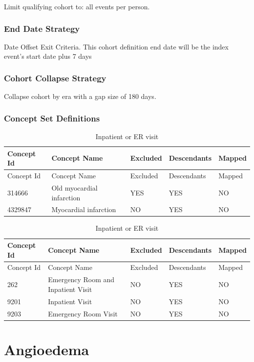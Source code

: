 \documentclass[10.5pt]{book}
\theoremstyle{definition}
\theoremstyle{definition}
\theoremstyle{definition}
\theoremstyle{remark}
\begin{document}
Limit qualifying cohort to: all events per person.

\subsubsection*{End Date Strategy}\label{end-date-strategy-2}

Date Offset Exit Criteria. This cohort definition end date will be the
index event's start date plus 7 days

\subsubsection*{Cohort Collapse
Strategy}\label{cohort-collapse-strategy-2}

Collapse cohort by era with a gap size of 180 days.

\subsubsection*{Concept Set
Definitions}\label{concept-set-definitions-2}

\begin{longtable}[]{@{}lllll@{}}
\caption{\label{tab:ami} Inpatient or ER visit}\tabularnewline
\toprule
Concept Id & Concept Name & Excluded & Descendants &
Mapped\tabularnewline
\midrule
\endfirsthead
\toprule
Concept Id & Concept Name & Excluded & Descendants &
Mapped\tabularnewline
\midrule
\endhead
314666 & Old myocardial infarction & YES & YES & NO\tabularnewline
4329847 & Myocardial infarction & NO & YES & NO\tabularnewline
\bottomrule
\end{longtable}

\begin{longtable}[]{@{}lllll@{}}
\caption{\label{tab:inpatientOrErAmi} Inpatient or ER visit}\tabularnewline
\toprule
Concept Id & Concept Name & Excluded & Descendants &
Mapped\tabularnewline
\midrule
\endfirsthead
\toprule
Concept Id & Concept Name & Excluded & Descendants &
Mapped\tabularnewline
\midrule
\endhead
262 & Emergency Room and Inpatient Visit & NO & YES & NO\tabularnewline
9201 & Inpatient Visit & NO & YES & NO\tabularnewline
9203 & Emergency Room Visit & NO & YES & NO\tabularnewline
\bottomrule
\end{longtable}

\section{Angioedema}\label{Angioedema}
\end{document}
